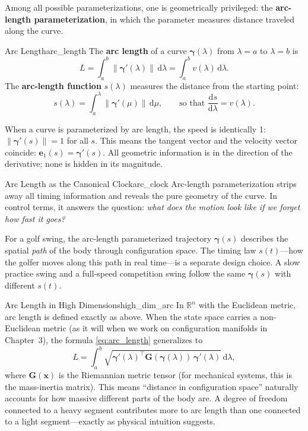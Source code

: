 \documentclass[12pt, openany]{book}
\theoremstyle{plain}
\newcommand{\state}{\bm{x}}
\newcommand{\traj}{\bm{\gamma}}
\newcommand{\Reals}{\mathbb{R}}
\newcommand{\dd}{\mathrm{d}}
\newcommand{\norm}[1]{\left\lVert #1 \right\rVert}
\newcommand{\tangent}{\bm{e}_1}
\begin{document}
Among all possible parameterizations, one is geometrically privileged: the
\textbf{arc-length parameterization}, in which the parameter measures distance
traveled along the curve.

\begin{definition}{Arc Length}{arc_length}
  The \textbf{arc length} of a curve $\traj(\lambda)$ from $\lambda = a$ to
  $\lambda = b$ is
  \begin{equation}\label{eq:arc_length}
    L = \int_a^b \norm{\traj'(\lambda)} \, \dd\lambda
    = \int_a^b v(\lambda) \, \dd\lambda.
  \end{equation}
  The \textbf{arc-length function} $s(\lambda)$ measures the distance from the
  starting point:
  \begin{equation}
    s(\lambda) = \int_a^{\lambda} \norm{\traj'(\mu)} \, \dd\mu,
    \qquad \text{so that } \frac{\dd s}{\dd\lambda} = v(\lambda).
  \end{equation}
\end{definition}

When a curve is parameterized by arc length, the speed is identically 1:
$\norm{\traj'(s)} = 1$ for all $s$. This means the tangent vector and the velocity
vector coincide: $\tangent(s) = \traj'(s)$. All geometric information is in the
direction of the derivative; none is hidden in its magnitude.

\begin{principle}{Arc Length as the Canonical Clock}{arc_clock}
  Arc-length parameterization strips away all timing information and reveals
  the pure geometry of the curve. In control terms, it answers the question:
  \emph{what does the motion look like if we forget how fast it goes?}

  For a golf swing, the arc-length parameterized trajectory $\traj(s)$
  describes the spatial \emph{path} of the body through configuration space.
  The timing law $s(t)$---how the golfer moves along this path in real
  time---is a separate design choice. A slow practice swing and a full-speed
  competition swing follow the same $\traj(s)$ with different $s(t)$.
\end{principle}

\begin{remark}{Arc Length in High Dimensions}{high_dim_arc}
  In $\Reals^n$ with the Euclidean metric, arc length is defined exactly as
  above. When the state space carries a non-Euclidean metric (as it will when
  we work on configuration manifolds in Chapter~3), the formula
  \eqref{eq:arc_length} generalizes to
  \begin{equation}
    L = \int_a^b \sqrt{\traj'(\lambda)^\top \bm{G}(\traj(\lambda))\,
    \traj'(\lambda)} \, \dd\lambda,
  \end{equation}
  where $\bm{G}(\state)$ is the Riemannian metric tensor (for mechanical systems,
  this is the mass-inertia matrix). This means ``distance in configuration
  space'' naturally accounts for how massive different parts of the body are.
  A degree of freedom connected to a heavy segment contributes more to arc
  length than one connected to a light segment---exactly as physical intuition
  suggests.
\end{remark}
\end{document}
